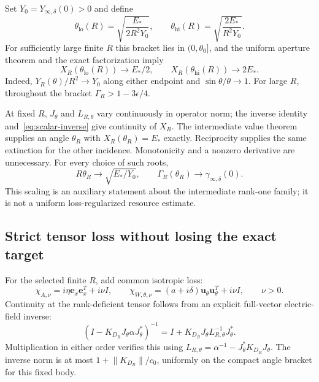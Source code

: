 \documentclass[11pt]{article}
\newcommand{\ex}{\mathbf e_x}
\newcommand{\uvec}{\mathbf u_\theta}
\newcommand{\norm}[1]{\lVert #1\rVert}
\begin{document}
Set $Y_0=Y_{\infty,\delta}(0)>0$ and define
\begin{equation}\label{eq:angle-bracket}
 \theta_{\mathrm{lo}}(R)=\sqrt{\frac{E_*}{2R^2Y_0}},\qquad
 \theta_{\mathrm{hi}}(R)=\sqrt{\frac{2E_*}{R^2Y_0}}.
\end{equation}
For sufficiently large finite $R$ this bracket lies in $(0,\theta_0]$, and the uniform aperture theorem and the exact factorization imply
\begin{equation}\label{eq:endpoints}
 X_R(\theta_{\mathrm{lo}}(R))\to E_*/2,\qquad
 X_R(\theta_{\mathrm{hi}}(R))\to2E_*.
\end{equation}
Indeed, $Y_R(\theta)/R^2\to Y_0$ along either endpoint and $\sin\theta/\theta\to1$. For large $R$, throughout the bracket $\Gamma_R>1-3\epsilon/4$.

At fixed $R$, $J_\theta$ and $L_{R,\theta}$ vary continuously in operator norm; the inverse identity and~\eqref{eq:scalar-inverse} give continuity of $X_R$. The intermediate value theorem supplies an angle $\theta_R$ with $X_R(\theta_R)=E_*$ exactly. Reciprocity supplies the same extinction for the other incidence. Monotonicity and a nonzero derivative are unnecessary. For every choice of such roots,
\begin{equation}\label{eq:root-scaling}
 R\theta_R\to\sqrt{E_*/Y_0},\qquad
 \Gamma_R(\theta_R)\to\gamma_{\infty,\delta}(0).
\end{equation}
This scaling is an auxiliary statement about the intermediate rank-one family; it is not a uniform loss-regularized resource estimate.

\subsection{Strict tensor loss without losing the exact target}
For the selected finite $R$, add common isotropic loss:
\begin{equation}\label{eq:positive-loss}
 \chi_{A,\nu}=i\eta\ex\ex^T+i\nu I,\qquad
 \chi_{W,\theta,\nu}=(a+i\delta)\uvec\uvec^T+i\nu I,
 \qquad\nu>0.
\end{equation}
Continuity at the rank-deficient tensor follows from an explicit full-vector electric-field inverse:
\begin{equation}\label{eq:electric-inverse}
 (I-K_{D_R}J_\theta\alpha J_\theta^*)^{-1}
 =I+K_{D_R}J_\theta L_{R,\theta}^{-1}J_\theta^*.
\end{equation}
Multiplication in either order verifies this using $L_{R,\theta}=\alpha^{-1}-J_\theta^*K_{D_R}J_\theta$. The inverse norm is at most $1+\norm{K_{D_R}}/c_0$, uniformly on the compact angle bracket for this fixed body.
\end{document}
